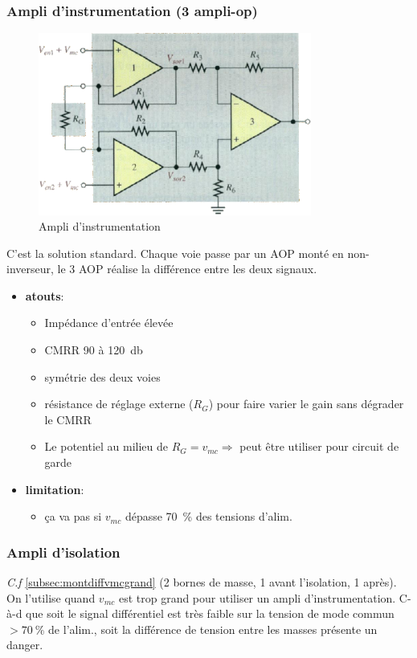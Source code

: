 \subsubsection{Ampli d'instrumentation (3 ampli-op)}
\begin{figure}[H] 
	\centering 
	\includegraphics[width=0.8\textwidth,height=10\baselineskip,keepaspectratio]{ch4/image3} 
	\caption{Ampli d'instrumentation} 
\end{figure}
C'est la solution standard. Chaque voie passe par un AOP monté en non-inverseur, le 3 AOP réalise la différence entre les deux signaux.
\begin{itemize}
	\item \textbf{atouts}:
	\begin{itemize}
		\item Impédance d'entrée élevée
		\item CMRR \num{90} à \SI{120}{\decibel}
		\item symétrie des deux voies
		\item résistance de réglage externe (\(R_G\)) pour faire varier le gain sans dégrader le CMRR
		\item Le potentiel au milieu de \(R_G = v_{mc}\Rightarrow\) peut être utiliser pour circuit de garde
	\end{itemize}
	\item \textbf{limitation}:
	\begin{itemize}
		\item ça va pas si \(v_{mc}\) dépasse \SI{70}{\percent} des tensions d'alim.
	\end{itemize}
\end{itemize}
\subsubsection{Ampli d'isolation}
\textit{C.f} \autoref{subsec:montdiffvmcgrand} (2 bornes de masse, 1 avant l'isolation, 1 après). On l'utilise quand \(v_{mc}\) est trop grand pour utiliser un ampli d'instrumentation. C-à-d que soit le signal différentiel est très faible sur la tension de mode commun \(>\SI{70}{\percent}\) de l'alim., soit la différence de tension entre les masses présente un danger.
